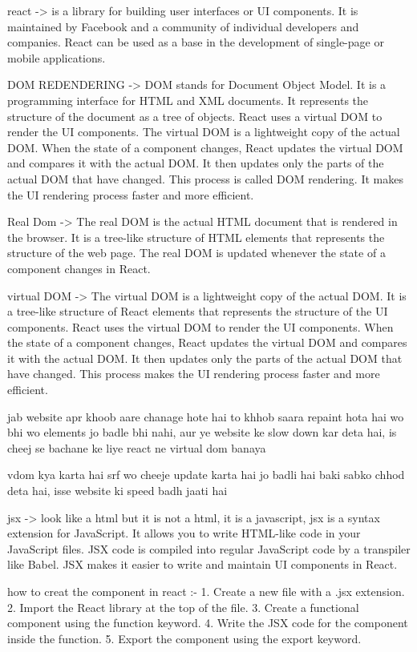 react -> is a library for building user interfaces or UI components. It is maintained by Facebook and a community of individual developers and companies. React can be used as a base in the development of single-page or mobile applications.

DOM REDENDERING -> DOM stands for Document Object Model. It is a programming interface for HTML and XML documents. It represents the structure of the document as a tree of objects. React uses a virtual DOM to render the UI components. The virtual DOM is a lightweight copy of the actual DOM. When the state of a component changes, React updates the virtual DOM and compares it with the actual DOM. It then updates only the parts of the actual DOM that have changed. This process is called DOM rendering. It makes the UI rendering process faster and more efficient.

Real Dom -> The real DOM is the actual HTML document that is rendered in the browser. It is a tree-like structure of HTML elements that represents the structure of the web page. The real DOM is updated whenever the state of a component changes in React.

virtual DOM -> The virtual DOM is a lightweight copy of the actual DOM. It is a tree-like structure of React elements that represents the structure of the UI components. React uses the virtual DOM to render the UI components. When the state of a component changes, React updates the virtual DOM and compares it with the actual DOM. It then updates only the parts of the actual DOM that have changed. This process makes the UI rendering process faster and more efficient.

jab website apr khoob aare chanage hote hai to khhob saara repaint hota hai wo bhi wo elements jo badle bhi nahi, aur ye website ke slow down kar deta hai, is cheej se bachane ke liye react ne virtual dom banaya

vdom kya karta hai srf wo cheeje update karta hai jo badli hai baki sabko chhod deta hai, isse website ki speed badh jaati hai

jsx -> look like a html but it is not a html, it is a javascript, jsx is a syntax extension for JavaScript. It allows you to write HTML-like code in your JavaScript files. JSX code is compiled into regular JavaScript code by a transpiler like Babel. JSX makes it easier to write and maintain UI components in React.

how to creat the component in react :-
1. Create a new file with a .jsx extension.
2. Import the React library at the top of the file.
3. Create a functional component using the function keyword.
4. Write the JSX code for the component inside the function.
5. Export the component using the export keyword.


